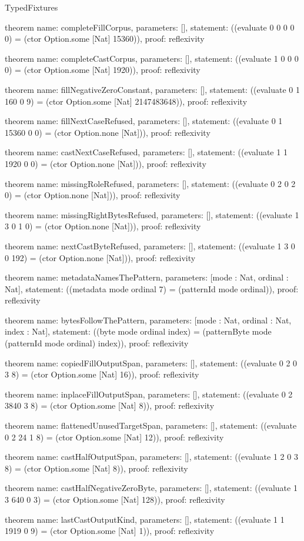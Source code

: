 \begin{lexlean}{TypedFixtures}
\begin{semanticmodule}
theorem{
  name: completeFillCorpus,
  parameters: [],
  statement: ((evaluate 0 0 0 0 0) = (ctor Option.some [Nat] 15360)),
  proof: reflexivity{}
}

theorem{
  name: completeCastCorpus,
  parameters: [],
  statement: ((evaluate 1 0 0 0 0) = (ctor Option.some [Nat] 1920)),
  proof: reflexivity{}
}

theorem{
  name: fillNegativeZeroConstant,
  parameters: [],
  statement: ((evaluate 0 1 160 0 9) = (ctor Option.some [Nat] 2147483648)),
  proof: reflexivity{}
}

theorem{
  name: fillNextCaseRefused,
  parameters: [],
  statement: ((evaluate 0 1 15360 0 0) = (ctor Option.none [Nat])),
  proof: reflexivity{}
}

theorem{
  name: castNextCaseRefused,
  parameters: [],
  statement: ((evaluate 1 1 1920 0 0) = (ctor Option.none [Nat])),
  proof: reflexivity{}
}

theorem{
  name: missingRoleRefused,
  parameters: [],
  statement: ((evaluate 0 2 0 2 0) = (ctor Option.none [Nat])),
  proof: reflexivity{}
}

theorem{
  name: missingRightBytesRefused,
  parameters: [],
  statement: ((evaluate 1 3 0 1 0) = (ctor Option.none [Nat])),
  proof: reflexivity{}
}

theorem{
  name: nextCastByteRefused,
  parameters: [],
  statement: ((evaluate 1 3 0 0 192) = (ctor Option.none [Nat])),
  proof: reflexivity{}
}

theorem{
  name: metadataNamesThePattern,
  parameters: [mode : Nat, ordinal : Nat],
  statement: ((metadata mode ordinal 7) = (patternId mode ordinal)),
  proof: reflexivity{}
}

theorem{
  name: bytesFollowThePattern,
  parameters: [mode : Nat, ordinal : Nat, index : Nat],
  statement: ((byte mode ordinal index) = (patternByte mode (patternId mode ordinal) index)),
  proof: reflexivity{}
}

theorem{
  name: copiedFillOutputSpan,
  parameters: [],
  statement: ((evaluate 0 2 0 3 8) = (ctor Option.some [Nat] 16)),
  proof: reflexivity{}
}

theorem{
  name: inplaceFillOutputSpan,
  parameters: [],
  statement: ((evaluate 0 2 3840 3 8) = (ctor Option.some [Nat] 8)),
  proof: reflexivity{}
}

theorem{
  name: flattenedUnusedTargetSpan,
  parameters: [],
  statement: ((evaluate 0 2 24 1 8) = (ctor Option.some [Nat] 12)),
  proof: reflexivity{}
}

theorem{
  name: castHalfOutputSpan,
  parameters: [],
  statement: ((evaluate 1 2 0 3 8) = (ctor Option.some [Nat] 8)),
  proof: reflexivity{}
}

theorem{
  name: castHalfNegativeZeroByte,
  parameters: [],
  statement: ((evaluate 1 3 640 0 3) = (ctor Option.some [Nat] 128)),
  proof: reflexivity{}
}

theorem{
  name: lastCastOutputKind,
  parameters: [],
  statement: ((evaluate 1 1 1919 0 9) = (ctor Option.some [Nat] 1)),
  proof: reflexivity{}
}
\end{semanticmodule}
\end{lexlean}
